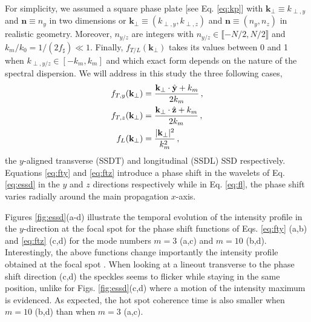 \documentclass[
 reprint,
 amsmath,amssymb,
 aps,
]{revtex4-1}
\begin{document}
 For simplicity, we  assumed a square phase plate [see Eq. \eqref{eq:kp}] with $\mathbf{k}_{\perp }\equiv k_{\perp,y}$ and $\mathbf{n}\equiv n_y$ in two dimensions or  $\mathbf{k}_{\perp }\equiv (k_{\perp,y},k_{\perp,z}) $ and $\mathbf{n}\equiv (n_y,n_z)$ in  realistic geometry. Moreover,   $n_{y/z}$ are integers with $n_{y/z}\in \llbracket - N/2 ,N/2 \rrbracket$ and $k_m/k_0 =1/(2f_\sharp)\ll 1$.
 Finally, $f_{T/L}(\mathbf{k}_\perp)$  takes its values between 0 and 1 when $k_{\perp,y/z}\in [-k_m , k_m]$ and which exact form depends on the nature of the spectral dispersion. We will address in this study the three following cases, 
\begin{align}
 f_{T,y}(\mathbf{k}_\perp)&=\frac{\mathbf{k}_\perp\cdot \Hat{\mathbf{y}}+k_m}{2k_m} \label{eq:fty} \, , \\
 f_{T,z}(\mathbf{k}_\perp)&=\frac{\mathbf{k}_\perp\cdot \Hat{\mathbf{z}}+k_m}{2k_m} \label{eq:ftz} \, , \\
f_L(\mathbf{k}_\perp)&=\frac{\vert \mathbf{k}_\perp\vert^2}{k_m^2} \label{eq:fl} \, ,
\end{align}
the $y$-aligned transverse (SSDT) and longitudinal (SSDL) SSD respectively. Equations \eqref{eq:fty} and  \eqref{eq:ftz}  introduce a phase shift in  the wavelets  of Eq. \eqref{eq:essd} in the $y$ and $z$ directions respectively while in Eq. \eqref{eq:fl}, the phase shift varies radially around the main propagation $x$-axis.

Figures \ref{fig:essd}(a-d) illustrate the temporal evolution of the intensity profile in the $y$-direction  at the focal spot for the phase shift functions of  Eqs. \eqref{eq:fty} (a,b) and  \eqref{eq:ftz} (c,d) for  the mode numbers $m=3$ (a,c) and $m=10$ (b,d).  Interestingly,  the above functions change importantly the  intensity profile obtained at the focal spot \cite[]{phd-Duluc,POP_Duluc_2019}. When looking at a lineout transverse to the phase shift direction (c,d) the speckles seems to flicker while staying in the same position, unlike for Figs. \ref{fig:essd}(c,d) where a motion of the intensity maximum is evidenced. As expected, the hot spot coherence time is also smaller when $m=10$ (b,d) than  when $m=3$ (a,c).
 
\end{document}
